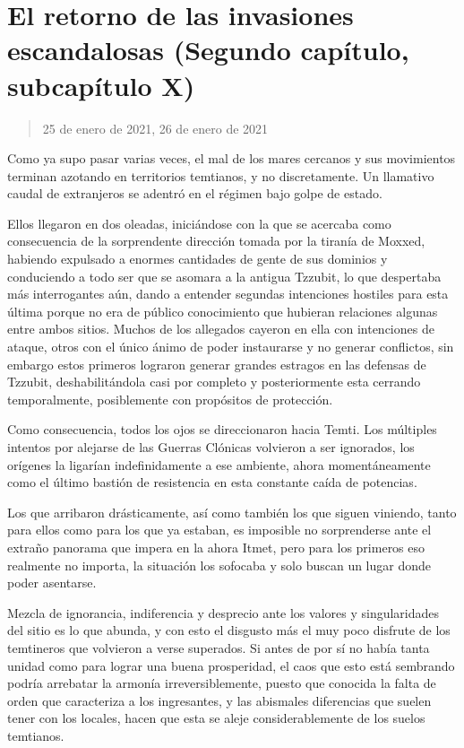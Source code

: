 \documentclass[
  spanish,
]{book}
\begin{document}
\hypertarget{el-retorno-de-las-invasiones-escandalosas-segundo-capuxedtulo-subcapuxedtulo-x}{%
\section{El retorno de las invasiones escandalosas (Segundo capítulo, subcapítulo X)}\label{el-retorno-de-las-invasiones-escandalosas-segundo-capuxedtulo-subcapuxedtulo-x}}

\begin{quote}
25 de enero de 2021, 26 de enero de 2021
\end{quote}

Como ya supo pasar varias veces, el mal de los mares cercanos y sus movimientos terminan azotando en territorios temtianos, y no discretamente. Un llamativo caudal de extranjeros se adentró en el régimen bajo golpe de estado.

Ellos llegaron en dos oleadas, iniciándose con la que se acercaba como consecuencia de la sorprendente dirección tomada por la tiranía de Moxxed, habiendo expulsado a enormes cantidades de gente de sus dominios y conduciendo a todo ser que se asomara a la antigua Tzzubit, lo que despertaba más interrogantes aún, dando a entender segundas intenciones hostiles para esta última porque no era de público conocimiento que hubieran relaciones algunas entre ambos sitios. Muchos de los allegados cayeron en ella con intenciones de ataque, otros con el único ánimo de poder instaurarse y no generar conflictos, sin embargo estos primeros lograron generar grandes estragos en las defensas de Tzzubit, deshabilitándola casi por completo y posteriormente esta cerrando temporalmente, posiblemente con propósitos de protección.

Como consecuencia, todos los ojos se direccionaron hacia Temti. Los múltiples intentos por alejarse de las Guerras Clónicas volvieron a ser ignorados, los orígenes la ligarían indefinidamente a ese ambiente, ahora momentáneamente como el último bastión de resistencia en esta constante caída de potencias.

Los que arribaron drásticamente, así como también los que siguen viniendo, tanto para ellos como para los que ya estaban, es imposible no sorprenderse ante el extraño panorama que impera en la ahora Itmet, pero para los primeros eso realmente no importa, la situación los sofocaba y solo buscan un lugar donde poder asentarse.

Mezcla de ignorancia, indiferencia y desprecio ante los valores y singularidades del sitio es lo que abunda, y con esto el disgusto más el muy poco disfrute de los temtineros que volvieron a verse superados. Si antes de por sí no había tanta unidad como para lograr una buena prosperidad, el caos que esto está sembrando podría arrebatar la armonía irreversiblemente, puesto que conocida la falta de orden que caracteriza a los ingresantes, y las abismales diferencias que suelen tener con los locales, hacen que esta se aleje considerablemente de los suelos temtianos.
\end{document}
